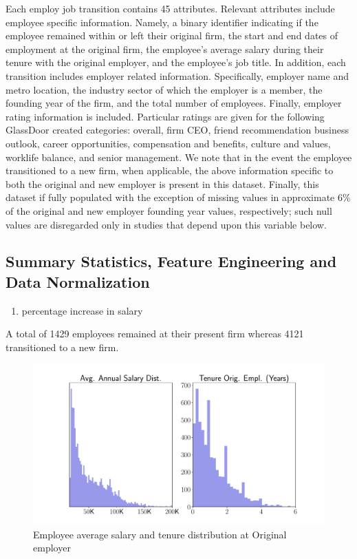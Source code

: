\documentclass[10pt]{article}
\begin{document}
Each employ job transition contains 45 attributes.  Relevant attributes 
include employee specific information. Namely, a binary identifier 
indicating if the employee remained within or left their original firm,
the start and end dates of employment at the original firm, the 
employee's average salary during their tenure with the original employer, 
and the employee's job title. 
In addition, each transition includes employer related information. 
Specifically, employer name and metro location, the industry sector of which the employer 
is a member, the founding year of the firm, and the total number of employees. 
Finally, employer rating information is included.  Particular ratings are 
given for the following GlassDoor created categories: overall, firm CEO, friend recommendation 
business outlook, career opportunities, compensation and benefits, culture and values, 
worklife balance, and senior management. 
We note that in the event the employee transitioned to a new firm, when applicable,
the above information specific to both the original and new employer is present in this dataset. 
Finally, this dataset if fully populated with the exception of missing values in 
approximate 6\% of the original and new employer founding year values, respectively;
such null values are disregarded 
only in studies that depend upon this variable below.

\subsection{Summary Statistics, Feature Engineering and Data Normalization}

\begin{enumerate}
    \item percentage increase in salary 
\end{enumerate}


A total of 1429 employees remained at their present firm whereas 4121 
transitioned to a new firm.

\begin{figure}[thb]
    \centering
	\includegraphics[width=1.0\linewidth]{avgsal.pdf}
	\caption{Employee average salary and tenure distribution at Original employer}
	\label{fig:avgsal}
\end{figure}
\end{document}
